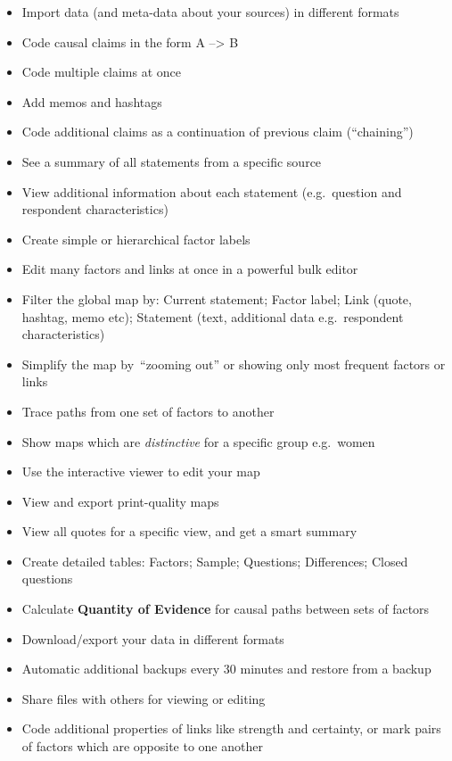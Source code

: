 \documentclass[
]{book}
\providecommand{\tightlist}{%
  \setlength{\itemsep}{0pt}\setlength{\parskip}{0pt}}
\begin{document}
\begin{itemize}
\tightlist
\item
  Import data (and meta-data about your sources) in different formats
\item
  Code causal claims in the form A --\textgreater{} B
\item
  Code multiple claims at once
\item
  Add memos and hashtags
\item
  Code additional claims as a continuation of previous claim (``chaining'')
\item
  See a summary of all statements from a specific source
\item
  View additional information about each statement (e.g.~question and respondent characteristics)
\item
  Create simple or hierarchical factor labels
\item
  Edit many factors and links at once in a powerful bulk editor
\item
  Filter the global map by: Current statement; Factor label; Link (quote, hashtag, memo etc); Statement (text, additional data e.g.~respondent characteristics)
\item
  Simplify the map by~``zooming out'' or showing only most frequent factors or links
\item
  Trace paths from one set of factors to another
\item
  Show maps which are \emph{distinctive} for a specific group e.g.~women
\item
  Use the interactive viewer to edit your map
\item
  View and export print-quality maps
\item
  View all quotes for a specific view, and get a smart summary
\item
  Create detailed tables: Factors; Sample; Questions; Differences; Closed questions
\item
  Calculate \textbf{Quantity of Evidence} for causal paths between sets of factors
\item
  Download/export your data in different formats
\item
  Automatic additional backups every 30 minutes and restore from a backup
\item
  Share files with others for viewing or editing
\item
  Code additional properties of links like strength and certainty, or mark pairs of factors which are opposite to one another
\end{itemize}
\end{document}
